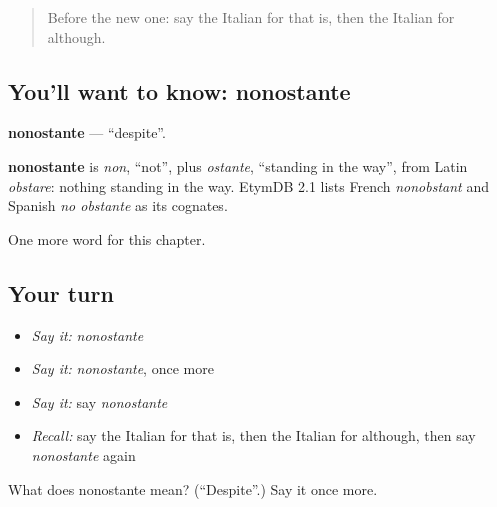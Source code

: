 \begin{quote}
Before the new one: say the Italian for that is, then the Italian for although.
\end{quote}

\subsection*{You'll want to know: nonostante}
\textbf{nonostante} — \textquotedblleft{}despite\textquotedblright{}.

\begin{cousinweb}
\textbf{nonostante} is \emph{non}, \textquotedblleft{}not\textquotedblright{}, plus \emph{ostante}, \textquotedblleft{}standing in the way\textquotedblright{}, from Latin \emph{obstare}: nothing standing in the way. EtymDB 2.1 lists French \emph{nonobstant} and Spanish \emph{no obstante} as its cognates.
\end{cousinweb}

\begin{grammarlens}[title={What you've built}]
One more word for this chapter.
\end{grammarlens}

\subsection*{Your turn}
\begin{itemize}
\raggedright
  \item \emph{Say it:} \emph{nonostante}
  \item \emph{Say it:} \emph{nonostante}, once more
  \item \emph{Say it:} say \emph{nonostante}
  \item \emph{Recall:} say the Italian for that is, then the Italian for although, then say \emph{nonostante} again
\end{itemize}

\begin{tcolorbox}[breakable,colback=teal!4,colframe=teal!35!black,title={Before you move on}]
What does nonostante mean? (\textquotedblleft{}Despite\textquotedblright{}.) Say it once more.
\end{tcolorbox}
